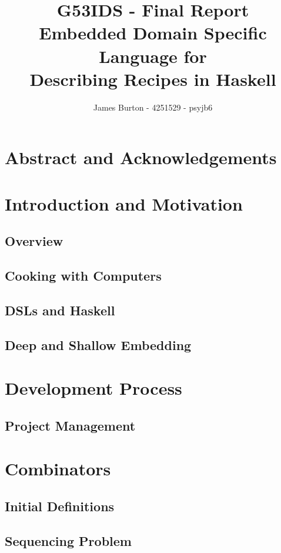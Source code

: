 \documentclass[11pt]{article}
\title
{ 
    \vspace{10em}
    G53IDS - Final Report \\
    \hfill \break
    \large Embedded Domain Specific Language for \\
    Describing Recipes in Haskell
}
\author{James Burton - 4251529 - psyjb6}
\begin{document}
    \maketitle
    \newpage

    \tableofcontents
    \newpage

    \section{Abstract and Acknowledgements}
    \newpage

    \section{Introduction and Motivation}
    \subsection{Overview}
    \subsection{Cooking with Computers}
    \subsection{DSLs and Haskell}
    \subsection{Deep and Shallow Embedding}

    \section{Development Process}
    \subsection{Project Management}
    
    \section{Combinators}
        \subsection{Initial Definitions}
        \subsection{Sequencing Problem}
\end{document}
